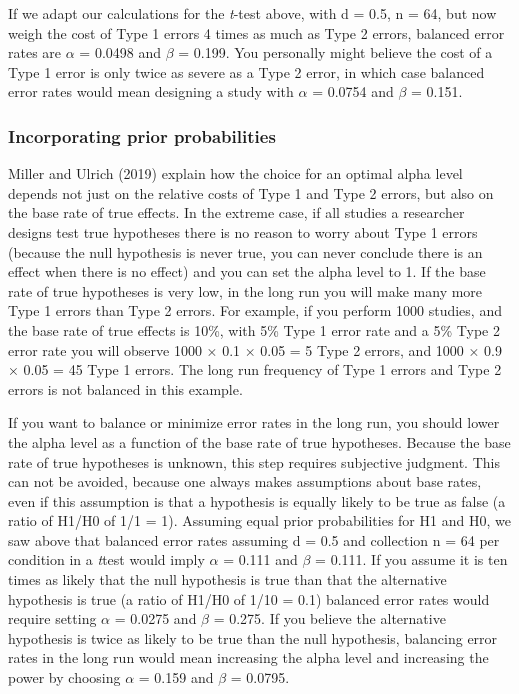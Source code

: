 \documentclass[,jou,floatsintext]{apa6}
\begin{document}
If we adapt our calculations for the \emph{t}-test above, with d = 0.5, n = 64, but now weigh the cost of Type 1 errors 4 times as much as Type 2 errors, balanced error rates are \(\alpha\) = 0.0498 and \(\beta\) = 0.199. You personally might believe the cost of a Type 1 error is only twice as severe as a Type 2 error, in which case balanced error rates would mean designing a study with \(\alpha\) = 0.0754 and \(\beta\) = 0.151.

\hypertarget{incorporating-prior-probabilities}{%
\subsubsection{Incorporating prior probabilities}\label{incorporating-prior-probabilities}}

Miller and Ulrich (2019) explain how the choice for an optimal alpha level depends not just on the relative costs of Type 1 and Type 2 errors, but also on the base rate of true effects. In the extreme case, if all studies a researcher designs test true hypotheses there is no reason to worry about Type 1 errors (because the null hypothesis is never true, you can never conclude there is an effect when there is no effect) and you can set the alpha level to 1. If the base rate of true hypotheses is very low, in the long run you will make many more Type 1 errors than Type 2 errors. For example, if you perform 1000 studies, and the base rate of true effects is 10\%, with 5\% Type 1 error rate and a 5\% Type 2 error rate you will observe 1000 × 0.1 × 0.05 = 5 Type 2 errors, and 1000 × 0.9 × 0.05 = 45 Type 1 errors. The long run frequency of Type 1 errors and Type 2 errors is not balanced in this example.

If you want to balance or minimize error rates in the long run, you should lower the alpha level as a function of the base rate of true hypotheses. Because the base rate of true hypotheses is unknown, this step requires subjective judgment. This can not be avoided, because one always makes assumptions about base rates, even if this assumption is that a hypothesis is equally likely to be true as false (a ratio of H1/H0 of 1/1 = 1). Assuming equal prior probabilities for H1 and H0, we saw above that balanced error rates assuming d = 0.5 and collection n = 64 per condition in a \emph{t}test would imply \(\alpha\) = 0.111 and \(\beta\) = 0.111. If you assume it is ten times as likely that the null hypothesis is true than that the alternative hypothesis is true (a ratio of H1/H0 of 1/10 = 0.1) balanced error rates would require setting \(\alpha\) = 0.0275 and \(\beta\) = 0.275. If you believe the alternative hypothesis is twice as likely to be true than the null hypothesis, balancing error rates in the long run would mean increasing the alpha level and increasing the power by choosing \(\alpha\) = 0.159 and \(\beta\) = 0.0795.
\end{document}
